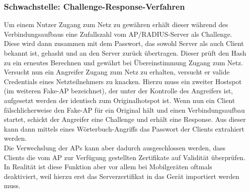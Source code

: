 \subsubsection{Schwachstelle: Challenge-Response-Verfahren}
Um einem Nutzer Zugang zum Netz zu gewähren erhält dieser während des Verbindungsaufbaus eine Zufallszahl vom AP/RADIUS-Server als Challenge. Diese wird dann zusammen mit dem Passwort, das sowohl Server als auch Client bekannt ist, gehasht und an den Server zurück übertragen. Dieser prüft den Hash zu ein erneutes Berechnen und gewährt bei Übereinstimmung Zugang zum Netz. \\
Versucht nun ein Angreifer Zugang zum Netz zu erhalten, versucht er valide Credentials eines Netzteilnehmers zu knacken. Hierzu muss ein zweiter Hostspot (im weiteren Fake-AP bezeichnet), der unter der Kontrolle des Angreifers ist, aufgesetzt werden der identisch zum Originalhotspot ist. Wenn nun ein Client fälschlicherweise den Fake-AP für ein Original hält und einen Verbindungsaufbau startet, schickt der Angreifer eine Challenge und erhält eine Response. Aus dieser kann dann mittels eines Wörterbuch-Angriffs das Passwort der Clients extrahiert werden. \\
Die Verwechslung der APs kann aber dadurch ausgeschlossen werden, dass Clients die vom AP zur Verfügung gestellten Zertifikate auf Validität überprüfen. In Realität ist diese Funktion aber vor allem bei Mobilgeräten oftmals deaktiviert, weil hierzu erst das Serverzertifikat in das Gerät importiert werden muss.

